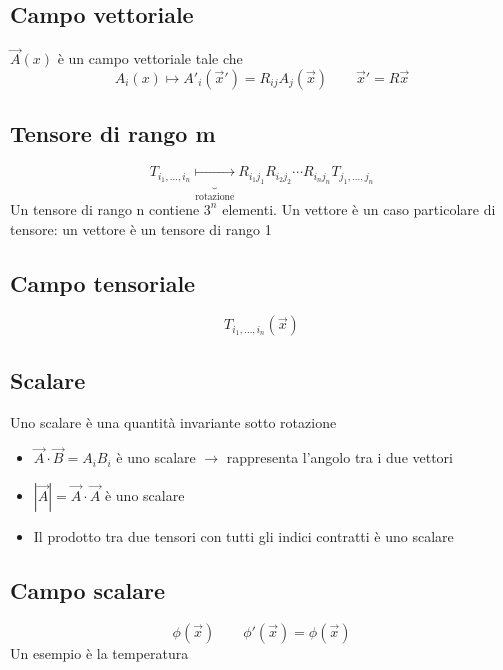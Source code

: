 \documentclass[a4paper,11pt]{report}
\theoremstyle{remark}
\theoremstyle{definition}
\begin{document}
\subsection*{Campo vettoriale}
$\vec{A}(x)$ è un campo vettoriale tale che 
\begin{equation*}
    A_i(x) \mapsto A'_i (\vec{x}') = R_{ij} A_j(\vec{x}) \qquad \vec{x}' = R \vec{x}
\end{equation*}

\subsection*{Tensore di rango m}

\begin{equation*}
    T_{i_1,\dots, i_n} \underbrace{\mapsto}_{\text{rotazione}} R_{i_1j_1}R_{i_2j_2}\cdots R_{i_nj_n}T_{j_1,\dots,j_n}
\end{equation*}
Un tensore di rango n contiene $3^n$ elementi. Un vettore è un caso particolare di tensore: un vettore è un tensore di rango 1

\subsection*{Campo tensoriale}
\begin{equation*}
    T_{i_1,\dots, i_n}(\vec{x})
\end{equation*}

\subsection*{Scalare}

Uno scalare è una quantità invariante sotto rotazione
\begin{itemize}
    \item $\vec{A} \cdot \vec{B} = A_iB_i$ è uno scalare $\rightarrow$ rappresenta l'angolo tra i due vettori
    \item $|\vec{A}| = \vec{A} \cdot \vec{A}$ è uno scalare
    \item Il prodotto tra due tensori con tutti gli indici contratti è uno scalare
\end{itemize}

\subsection*{Campo scalare}
\begin{equation*}
    \phi(\vec{x}) \qquad \phi'(\vec{x}) = \phi(\vec{x})
\end{equation*}
Un esempio è la temperatura
\end{document}
